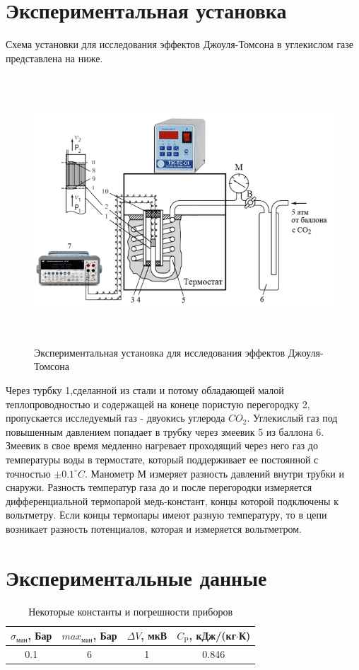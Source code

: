 \section*{Экспериментальная установка}
Схема установки для исследования эффектов Джоуля-Томсона в углекислом газе 
представлена на ниже.\\
\begin{figure}[h!]\label{fig:setup}
    \centering
    \includegraphics[width=15cm,height=10cm]{установка.png}
    \caption{Экспериментальная установка для исследования эффектов Джоуля-Томсона}
\end{figure}

\indent
Через турбку 1,сделанной из стали и потому обладающей малой теплопроводностью и
содержащей на конеце пористую перегородку 2, пропускается исследуемый
газ - двуокись углерода $CO_2$. Углекислый газ под повышенным давлением
попадает в трубку через змеевик 5 из баллона 6. Змеевик в свое время
медленно нагревает проходящий через него газ до температуры воды в термостате,
который поддерживает ее постоянной с точностью $\pm 0.1^{\circ}C$.
Манометр М измеряет разность давлений внутри трубки и снаружи.
Разность температур газа до и после перегородки измеряется дифференциальной
термопарой медь-констант, концы которой подключены к вольтметру. Если концы
термопары имеют разную температуру, то в цепи возникает разность потенциалов,
которая и измеряется вольтметром.

\section*{Экспериментальные данные}
\begin{table}[h!]
    \centering
    \begin{tabular}{|c|c|c|c|}
    \hline
    $\sigma_{\text{ман}}$, Бар & $max_{\text{ман}}$, Бар & $\Delta V$, мкВ & $C_{\text{P}}$, кДж/(кг$\cdot$К) \\\hline
    0.1 & 6 & 1 & 0.846 \\\hline
    \end{tabular}
    \caption{Некоторые константы и погрешности приборов}
\end{table}
\indent

